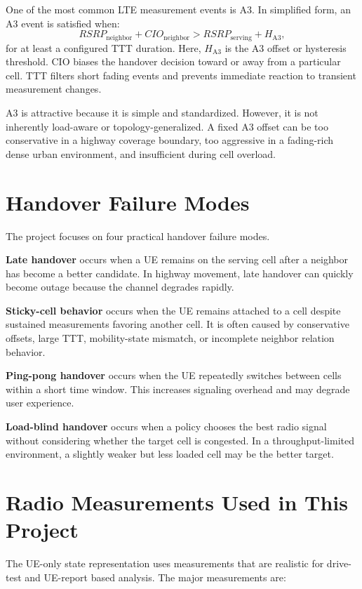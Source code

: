 \documentclass[12pt,a4paper]{report}
\begin{document}
One of the most common LTE measurement events is A3. In simplified form, an A3 event is satisfied when:
\begin{equation}
    RSRP_{\text{neighbor}} + CIO_{\text{neighbor}} > RSRP_{\text{serving}} + H_{\text{A3}},
\end{equation}
for at least a configured TTT duration. Here, $H_{\text{A3}}$ is the A3 offset or hysteresis threshold. CIO biases the handover decision toward or away from a particular cell. TTT filters short fading events and prevents immediate reaction to transient measurement changes.

A3 is attractive because it is simple and standardized. However, it is not inherently load-aware or topology-generalized. A fixed A3 offset can be too conservative in a highway coverage boundary, too aggressive in a fading-rich dense urban environment, and insufficient during cell overload.

\section{Handover Failure Modes}
The project focuses on four practical handover failure modes.

\textbf{Late handover} occurs when a UE remains on the serving cell after a neighbor has become a better candidate. In highway movement, late handover can quickly become outage because the channel degrades rapidly.

\textbf{Sticky-cell behavior} occurs when the UE remains attached to a cell despite sustained measurements favoring another cell. It is often caused by conservative offsets, large TTT, mobility-state mismatch, or incomplete neighbor relation behavior.

\textbf{Ping-pong handover} occurs when the UE repeatedly switches between cells within a short time window. This increases signaling overhead and may degrade user experience.

\textbf{Load-blind handover} occurs when a policy chooses the best radio signal without considering whether the target cell is congested. In a throughput-limited environment, a slightly weaker but less loaded cell may be the better target.

\section{Radio Measurements Used in This Project}
The UE-only state representation uses measurements that are realistic for drive-test and UE-report based analysis. The major measurements are:
\end{document}
